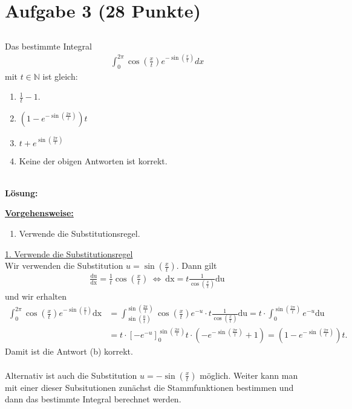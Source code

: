 \section*{Aufgabe 3 (28 Punkte)}
\vspace{0.4cm}
\subsection*{}
Das bestimmte Integral
\begin{align*}
	\int_0^{2\pi} \cos \left(\frac{x}{t}\right) e^{- \sin(\frac{x}{t})} dx
\end{align*}
mit $ t \in \mathbb{N} $ ist gleich:

\renewcommand{\labelenumi}{(\alph{enumi})}
\begin{enumerate}
	\item 
	$ \frac{1}{t} -1  $.
	\item
	$ (1 - e^{-\sin\left(\frac{2\pi}{t}\right)})t $
	\item
	$ t + e^{\sin\left(\frac{2\pi}{t}\right)} $
	\item 
	Keine der obigen Antworten ist korrekt.
\end{enumerate}
\ \\
\textbf{Lösung:}
\begin{mdframed}
\underline{\textbf{Vorgehensweise:}}
\renewcommand{\labelenumi}{\theenumi.}
\begin{enumerate}
\item Verwende die Substitutionsregel.
\end{enumerate}
\end{mdframed}

\underline{1. Verwende die Substitutionsregel}\\
Wir verwenden die Substitution $u = \sin\left(\frac{x}{t}\right)$. Dann gilt
\begin{align*}
	\frac{\mathrm{du}}{\mathrm{dx}} =\frac{1}{t} \cos\left(\frac{x}{t}\right)
	\ \Leftrightarrow \
	\mathrm{dx} = t \frac{1}{\cos\left(\frac{x}{t}\right)} \mathrm{du}
\end{align*}
und wir erhalten 
\begin{align*}
	\int_0^{2\pi} \cos \left(\frac{x}{t}\right) e^{- \sin(\frac{x}{t})} \mathrm{dx}
	&=
	\int_{\sin\left(\frac{0}{t}\right)}^{\sin\left(\frac{2\pi}{t}\right)} \cos\left(\frac{x}{t}\right) e^{-u}\cdot  t \frac{1}{\cos\left(\frac{x}{t}\right)} \mathrm{du}
	=
	t\cdot\int_{0}^{\sin\left(\frac{2\pi}{t}\right)} e^{-u}  \mathrm{du}\\
	&=
	t \cdot \left[-e^{-u}\right]_0^{\sin\left(\frac{2\pi}{t}\right)}
	t \cdot \left(-e^{-\sin\left(\frac{2\pi}{t}\right)} + 1\right)
	=
	\left(1 - e^{-\sin\left(\frac{2\pi}{t}\right)}\right)t.
\end{align*}
Damit ist die Antwort (b) korrekt.\\
\\
Alternativ ist auch die Substitution $u = - \sin\left(\frac{x}{t}\right)$ möglich. Weiter kann man mit einer dieser Subsitutionen zunächst die Stammfunktionen bestimmen und dann das bestimmte Integral berechnet werden.

